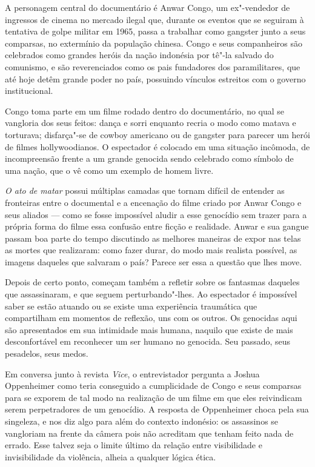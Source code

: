 A personagem central do documentário é Anwar Congo, um ex"-vendedor de ingressos de
cinema no mercado ilegal que, durante os eventos que se seguiram à
tentativa de golpe militar em 1965, passa a trabalhar como gangster
junto a seus comparsas, no extermínio da população chinesa. Congo e seus
companheiros são celebrados como grandes heróis da nação indonésia por
tê"-la salvado do comunismo, e são reverenciados como os pais fundadores
dos paramilitares, que até hoje detêm grande poder no país, possuindo vínculos
estreitos com o governo institucional.

Congo toma parte em um filme rodado dentro do documentário, no qual se
vangloria dos seus feitos: dança e sorri enquanto recria o modo como
matava e torturava; disfarça"-se de cowboy americano ou de gangster para
parecer um herói de filmes hollywoodianos. O espectador é
colocado em uma situação incômoda, de incompreensão frente a um grande
genocida sendo celebrado como símbolo de uma nação, que o vê como um
exemplo de homem livre.

\emph{O ato de matar} possui múltiplas camadas que tornam difícil de
entender as fronteiras entre o documental e a encenação do filme criado
por Anwar Congo e seus aliados --- como se fosse impossível aludir a
esse genocídio sem trazer para a própria forma do filme essa confusão
entre ficção e realidade. Anwar e sua gangue passam boa parte do tempo
discutindo as melhores maneiras de expor nas telas as mortes que
realizaram: como fazer durar, do modo mais realista possível, as imagens
daqueles que salvaram o país? Parece ser essa a questão que lhes move.

Depois de certo ponto, começam também a refletir sobre os fantasmas
daqueles que assassinaram, e que seguem perturbando"-lhes. Ao espectador
é impossível saber se estão atuando ou se existe uma experiência
traumática que compartilham em momentos de reflexão, uns com os outros.
Os genocidas aqui são apresentados em sua intimidade mais humana,
naquilo que existe de mais desconfortável em reconhecer um ser humano no
genocida. Seu passado, seus pesadelos, seus medos.

\asterisc

Em conversa junto à revista \emph{Vice}, o entrevistador pergunta a Joshua
Oppenheimer como teria conseguido a cumplicidade de Congo e seus
comparsas para se exporem de tal modo na realização de um filme em que
eles reivindicam serem perpetradores de um genocídio. A resposta de
Oppenheimer choca pela sua singeleza, e nos diz algo para além do
contexto indonésio: os assassinos se vangloriam na frente da câmera
pois não acreditam que tenham feito nada de errado. Esse talvez seja o
limite último da relação entre visibilidade e invisibilidade da
violência, alheia a qualquer lógica ética.

